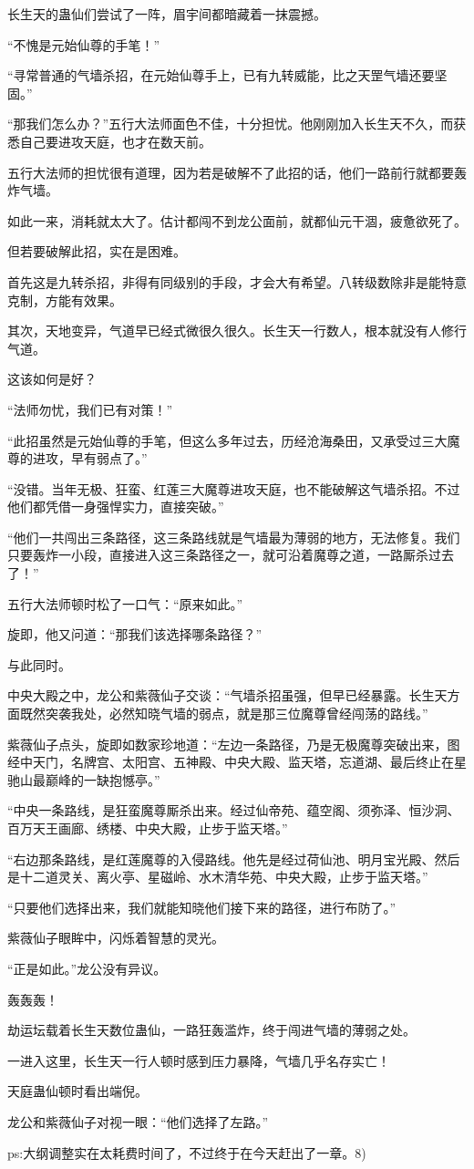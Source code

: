 \begin{this_body}
长生天的蛊仙们尝试了一阵，眉宇间都暗藏着一抹震撼。

“不愧是元始仙尊的手笔！”

“寻常普通的气墙杀招，在元始仙尊手上，已有九转威能，比之天罡气墙还要坚固。”

“那我们怎么办？”五行大法师面色不佳，十分担忧。他刚刚加入长生天不久，而获悉自己要进攻天庭，也才在数天前。

五行大法师的担忧很有道理，因为若是破解不了此招的话，他们一路前行就都要轰炸气墙。

如此一来，消耗就太大了。估计都闯不到龙公面前，就都仙元干涸，疲惫欲死了。

但若要破解此招，实在是困难。

首先这是九转杀招，非得有同级别的手段，才会大有希望。八转级数除非是能特意克制，方能有效果。

其次，天地变异，气道早已经式微很久很久。长生天一行数人，根本就没有人修行气道。

这该如何是好？

“法师勿忧，我们已有对策！”

“此招虽然是元始仙尊的手笔，但这么多年过去，历经沧海桑田，又承受过三大魔尊的进攻，早有弱点了。”

“没错。当年无极、狂蛮、红莲三大魔尊进攻天庭，也不能破解这气墙杀招。不过他们都凭借一身强悍实力，直接突破。”

“他们一共闯出三条路径，这三条路线就是气墙最为薄弱的地方，无法修复。我们只要轰炸一小段，直接进入这三条路径之一，就可沿着魔尊之道，一路厮杀过去了！”

五行大法师顿时松了一口气：“原来如此。”

旋即，他又问道：“那我们该选择哪条路径？”

与此同时。

中央大殿之中，龙公和紫薇仙子交谈：“气墙杀招虽强，但早已经暴露。长生天方面既然突袭我处，必然知晓气墙的弱点，就是那三位魔尊曾经闯荡的路线。”

紫薇仙子点头，旋即如数家珍地道：“左边一条路径，乃是无极魔尊突破出来，图经中天门，名牌宫、太阳宫、五神殿、中央大殿、监天塔，忘道湖、最后终止在星驰山最巅峰的一缺抱憾亭。”

“中央一条路线，是狂蛮魔尊厮杀出来。经过仙帝苑、蕴空阁、须弥泽、恒沙洞、百万天王画廊、绣楼、中央大殿，止步于监天塔。”

“右边那条路线，是红莲魔尊的入侵路线。他先是经过荷仙池、明月宝光殿、然后是十二道灵关、离火亭、星磁岭、水木清华苑、中央大殿，止步于监天塔。”

“只要他们选择出来，我们就能知晓他们接下来的路径，进行布防了。”

紫薇仙子眼眸中，闪烁着智慧的灵光。

“正是如此。”龙公没有异议。

轰轰轰！

劫运坛载着长生天数位蛊仙，一路狂轰滥炸，终于闯进气墙的薄弱之处。

一进入这里，长生天一行人顿时感到压力暴降，气墙几乎名存实亡！

天庭蛊仙顿时看出端倪。

龙公和紫薇仙子对视一眼：“他们选择了左路。”

ps:大纲调整实在太耗费时间了，不过终于在今天赶出了一章。8)

\end{this_body}

